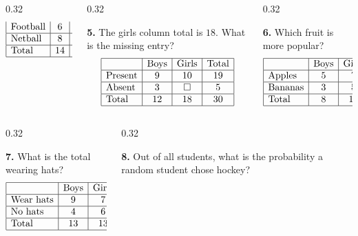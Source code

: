 \documentclass[aspectratio=169,12pt]{beamer}
\newcommand{\MMProblem}[2]{\begin{MMProblemCard}\raggedright\small\textbf{#1.} #2\par\end{MMProblemCard}}
\begin{document}
\begin{frame}[t]
\begin{columns}[T,onlytextwidth]
\begin{column}{0.32\textwidth}
{\[\begin{array}{|l|c|c|c|}
\text{Football} & 6 & \square & 14 \\\hline
\text{Netball} & 8 & 10 & 18 \\\hline
\text{Total} & 14 & 18 & 32 \\\hline
\end{array}
\]}\end{column}
\begin{column}{0.32\textwidth}\MMProblem{5}{The girls column total is \mbox{$18$}. What is the missing entry?
\[
\begin{array}{|l|c|c|c|}
\hline
 & \text{Boys} & \text{Girls} & \text{Total} \\\hline
\text{Present} & 9 & 10 & 19 \\\hline
\text{Absent} & 3 & \square & 5 \\\hline
\text{Total} & 12 & 18 & 30 \\\hline
\end{array}
\]}\end{column}
\begin{column}{0.32\textwidth}\MMProblem{6}{Which fruit is more popular?
\[
\begin{array}{|l|c|c|c|}
\hline
 & \text{Boys} & \text{Girls} & \text{Total} \\\hline
\text{Apples} & 5 & 7 & 12 \\\hline
\text{Bananas} & 3 & 5 & 8 \\\hline
\text{Total} & 8 & 12 & 20 \\\hline
\end{array}
\]}\end{column}
\end{columns}
\vspace{0.45em}
\begin{columns}[T,onlytextwidth]
\begin{column}{0.32\textwidth}\MMProblem{7}{What is the total wearing hats?
\[
\begin{array}{|l|c|c|c|}
\hline
 & \text{Boys} & \text{Girls} & \text{Total} \\\hline
\text{Wear hats} & 9 & 7 & \square \\\hline
\text{No hats} & 4 & 6 & 10 \\\hline
\text{Total} & 13 & 13 & 26 \\\hline
\end{array}
\]}\end{column}
\begin{column}{0.32\textwidth}\MMProblem{8}{Out of all students, what is the probability a random student chose hockey?
}
\end{column}
\end{columns}
\end{frame}
\end{document}

